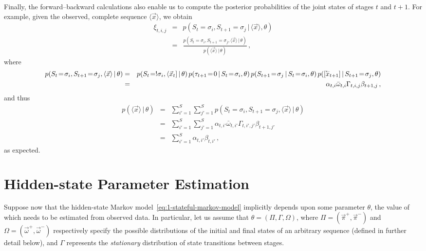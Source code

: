 \documentclass[a4paper]{article}
\newcommand{\rvec}[1]{\accentset{\leftarrow}{#1}}
\begin{document}
Finally, the forward--backward calculations also enable us to compute the posterior probabilities of the joint states of stages $t$ and $t+1$.
For example, given the observed, complete sequence $\langle\vec{x}\rangle$, we obtain
\begin{eqnarray}
\xi_{t,i,j} & = &
   p(S_t\!=\!\sigma_i,S_{t+1}\!=\!\sigma_j\,|\,\langle\vec{x}\rangle,\theta)
\nonumber\\& = & 
   \frac{p(S_t\!=\!\sigma_i,S_{t+1}\!=\!\sigma_j,\langle\vec{x}\rangle\,|\,\theta)}
        {p(\langle\vec{x}\rangle\,|\,\theta)}
\,,
\label{eq:xi_t_i_j}
\end{eqnarray}
where
\begin{eqnarray}
   p(S_t\!=\!\sigma_i,S_{t+1}\!=\!\sigma_j,\langle\vec{x}\rangle\,|\,\theta)
& = & 
   p(S_t\!=!\sigma_i,\langle\vec{x}_t]\,|\,\theta)
     \,p(\tau_{t+1}\!=\!0\,|\,S_t\!=\!\sigma_i,\theta)
     \,p(S_{t+1}\!=\!\sigma_j\,|\,S_t\!=\!\sigma_i,\theta)
	 \,p([\rvec{x}_{t+1}]\,|\,S_{t+1}\!=\!\sigma_j,\theta)
\nonumber\\& = & 
   \alpha_{t,i}\bar{\omega}_{t,i}\Gamma_{t,i,j}\beta_{t+1,j}
\,,
\end{eqnarray}
and thus
\begin{eqnarray}
   p(\langle\vec{x}\rangle\,|\,\theta)
& = &
   \sum_{i'=1}^{S}\sum_{j'=1}^{S}p(S_t\!=\!\sigma_i,S_{t+1}\!=\!\sigma_j,\langle\vec{x}\rangle\,|\,\theta)
\nonumber\\& = & 
   \sum_{i'=1}^{S}\sum_{j'=1}^{S}\alpha_{t,i'}\bar{\omega}_{t,i'}\Gamma_{t,i',j'}\beta_{t+1,j'}
\nonumber\\& = & 
   \sum_{i'=1}^{S}\alpha_{t,i'}\beta_{t,i'}
\,,
\end{eqnarray}
as expected.

\section{Hidden-state Parameter Estimation}

Suppose now that the hidden-state Markov model~\eqref{eq:1-stateful-markov-model} implicitly depends upon some
parameter $\theta$, the value of which needs to be estimated from observed data.
In particular, let us assume that $\theta=(\Pi,\Gamma,\Omega)$,
where $\Pi=(\vec{\pi}^+,\vec{\pi}^-)$ 
and $\Omega=(\vec{\omega}^+,\vec{\omega}^-)$ respectively
specify the possible distributions of the initial and final
states of an arbitrary sequence (defined in further detail below),
and $\Gamma$ represents the {\em stationary} distribution of state transitions between stages.
\end{document}
